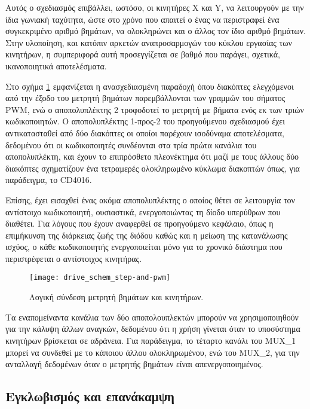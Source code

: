 Αυτός ο σχεδιασμός επιβάλλει, ωστόσο, οι κινητήρες X και Y, να λειτουργούν με
την ίδια γωνιακή ταχύτητα, ώστε στο χρόνο που απαιτεί ο ένας να περιστραφεί
ένα συγκεκριμένο αριθμό βημάτων, να ολοκληρώνει και ο άλλος τον ίδιο αριθμό
βημάτων. Στην υλοποίηση, και κατόπιν αρκετών αναπροσαρμογών του κύκλου εργασίας
των κινητήρων, η συμπεριφορά αυτή προσεγγίζεται σε βαθμό που παράγει, σχετικά,
ικανοποιητικά αποτελέσματα.

Στο σχήμα \ref{fig:motor:route_steps} εμφανίζεται η ανασχεδιασμένη παραδοχή
όπου διακόπτες ελεγχόμενοι από την έξοδο του μετρητή βημάτων παρεμβάλλονται των
γραμμών του σήματος PWM, ενώ ο αποπολυπλέκτης 2 τροφοδοτεί το μετρητή με βήματα
ενός εκ των τριών κωδικοποιητών. Ο αποπολυπλέκτης 1-προς-2 του προηγούμενου
σχεδιασμού έχει αντικατασταθεί από δύο διακόπτες οι οποίοι παρέχουν ισοδύναμα
αποτελέσματα, δεδομένου ότι οι κωδικοποιητές συνδέονται στα τρία πρώτα κανάλια
του αποπολυπλέκτη, και έχουν το επιπρόσθετο πλεονέκτημα ότι μαζί με τους άλλους
δύο διακόπτες σχηματίζουν ένα τετραμερές ολοκληρωμένο κύκλωμα διακοπτών όπως,
για παράδειγμα, το CD4016.

Επίσης, έχει εισαχθεί ένας ακόμα αποπολυπλέκτης ο οποίος θέτει σε λειτουργία
τον αντίστοιχο κωδικοποιητή, ουσιαστικά, ενεργοποιώντας τη δίοδο υπερύθρων που
διαθέτει. Για λόγους που έχουν αναφερθεί σε προηγούμενο κεφάλαιο, όπως η
επιμήκυνση της διάρκειας ζωής της διόδου καθώς και η μείωση της κατανάλωσης
ισχύος, ο κάθε κωδικοποιητής ενεργοποιείται μόνο για το χρονικό διάστημα που
περιστρέφεται ο αντίστοιχος κινητήρας.

\begin{figure}
    \caption{Λογική σύνδεση μετρητή βημάτων και κινητήρων.
    \label{fig:motor:route_steps}}
    \begin{center}
    \texttt{[image: drive\_schem\_step-and-pwm]}
    \end{center}
\end{figure}

Τα εναπομείναντα κανάλια των δύο αποπολουπλεκτών μπορούν να χρησιμοποιηθούν για
την κάλυψη άλλων αναγκών, δεδομένου ότι η χρήση γίνεται όταν το υποσύστημα
κινητήρων βρίσκεται σε αδράνεια. Για παράδειγμα, το τέταρτο κανάλι του MUX\_1
μπορεί να συνδεθεί με το  κάποιου άλλου ολοκληρωμένου, ενώ του MUX\_2,
για την ανταλλαγή δεδομένων όταν ο μετρητής βημάτων είναι απενεργοποιημένος.


\subsection{Εγκλωβισμός και επανάκαμψη}

